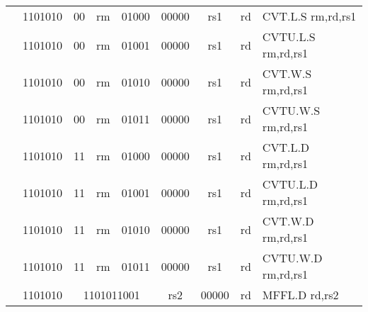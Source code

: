 \begin{table}[p]
\begin{small}
\begin{center}
\begin{tabular}{rcccccccccl}
&
\multicolumn{1}{|c|}{1101010} &
\multicolumn{1}{c|}{00} &
\multicolumn{2}{c|}{rm} &
\multicolumn{2}{c|}{01000} &
\multicolumn{1}{c|}{00000} &
\multicolumn{1}{c|}{rs1} &
\multicolumn{1}{c|}{rd} & CVT.L.S rm,rd,rs1 \\
\cline{2-10}
  

&
\multicolumn{1}{|c|}{1101010} &
\multicolumn{1}{c|}{00} &
\multicolumn{2}{c|}{rm} &
\multicolumn{2}{c|}{01001} &
\multicolumn{1}{c|}{00000} &
\multicolumn{1}{c|}{rs1} &
\multicolumn{1}{c|}{rd} & CVTU.L.S rm,rd,rs1 \\
\cline{2-10}
  

&
\multicolumn{1}{|c|}{1101010} &
\multicolumn{1}{c|}{00} &
\multicolumn{2}{c|}{rm} &
\multicolumn{2}{c|}{01010} &
\multicolumn{1}{c|}{00000} &
\multicolumn{1}{c|}{rs1} &
\multicolumn{1}{c|}{rd} & CVT.W.S rm,rd,rs1 \\
\cline{2-10}
  

&
\multicolumn{1}{|c|}{1101010} &
\multicolumn{1}{c|}{00} &
\multicolumn{2}{c|}{rm} &
\multicolumn{2}{c|}{01011} &
\multicolumn{1}{c|}{00000} &
\multicolumn{1}{c|}{rs1} &
\multicolumn{1}{c|}{rd} & CVTU.W.S rm,rd,rs1 \\
\cline{2-10}
  

&
\multicolumn{1}{|c|}{1101010} &
\multicolumn{1}{c|}{11} &
\multicolumn{2}{c|}{rm} &
\multicolumn{2}{c|}{01000} &
\multicolumn{1}{c|}{00000} &
\multicolumn{1}{c|}{rs1} &
\multicolumn{1}{c|}{rd} & CVT.L.D rm,rd,rs1 \\
\cline{2-10}
  

&
\multicolumn{1}{|c|}{1101010} &
\multicolumn{1}{c|}{11} &
\multicolumn{2}{c|}{rm} &
\multicolumn{2}{c|}{01001} &
\multicolumn{1}{c|}{00000} &
\multicolumn{1}{c|}{rs1} &
\multicolumn{1}{c|}{rd} & CVTU.L.D rm,rd,rs1 \\
\cline{2-10}
  

&
\multicolumn{1}{|c|}{1101010} &
\multicolumn{1}{c|}{11} &
\multicolumn{2}{c|}{rm} &
\multicolumn{2}{c|}{01010} &
\multicolumn{1}{c|}{00000} &
\multicolumn{1}{c|}{rs1} &
\multicolumn{1}{c|}{rd} & CVT.W.D rm,rd,rs1 \\
\cline{2-10}
  

&
\multicolumn{1}{|c|}{1101010} &
\multicolumn{1}{c|}{11} &
\multicolumn{2}{c|}{rm} &
\multicolumn{2}{c|}{01011} &
\multicolumn{1}{c|}{00000} &
\multicolumn{1}{c|}{rs1} &
\multicolumn{1}{c|}{rd} & CVTU.W.D rm,rd,rs1 \\
\cline{2-10}
  

&
\multicolumn{1}{|c|}{1101010} &
\multicolumn{5}{c|}{1101011001} &
\multicolumn{1}{c|}{rs2} &
\multicolumn{1}{c|}{00000} &
\multicolumn{1}{c|}{rd} & MFFL.D rd,rs2 \\
\cline{2-10}
  


\end{tabular}
\end{center}
\end{small}
\end{table}
